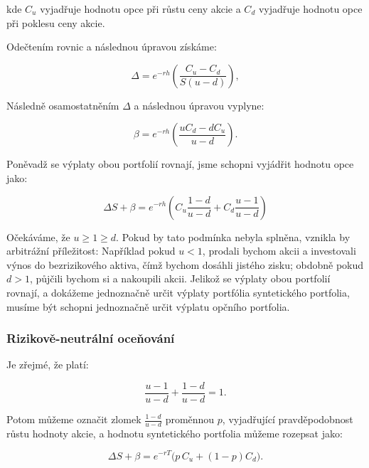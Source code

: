 \documentclass[male,czech,api_bc]{kitheses}
\begin{document}
  kde $C_u$ vyjadřuje hodnotu opce při růstu ceny akcie a $C_d$ vyjadřuje hodnotu opce při poklesu ceny akcie.

  Odečtením rovnic a následnou úpravou získáme: 

  \begin{equation}
    \Delta = e^{-rh} \left( \frac{C_u - C_d}{S (u - d)} \right),
  \end{equation}

  Následně osamostatněním $\Delta$ a následnou úpravou vyplyne:

  \begin{equation}
    \beta = e^{-rh} \left( \frac{u C_d - d C_u}{u - d} \right).
  \end{equation}

  Poněvadž se výplaty obou portfolií rovnají, jsme schopni vyjádřit hodnotu opce jako:

  \begin{equation}
    \label{eq_value}
    \Delta S + \beta = e^{-rh} \left( C_u \frac{1 - d}{u - d} + C_d \frac{u - 1}{u - d} \right)
  \end{equation}

  Očekáváme, že $u \ge 1 \ge d$. Pokud by tato podmínka nebyla splněna, vznikla by arbitrážní příležitost: Například pokud $u < 1$, prodali bychom akcii a investovali výnos do bezrizikového aktiva, čímž bychom dosáhli jistého zisku; obdobně pokud $d > 1$, půjčili bychom si a nakoupili akcii. \parencites[s.~311]{McDonald2013}
  Jelikož se výplaty obou portfolií rovnají, a dokážeme jednoznačně určit výplaty portfólia syntetického portfolia, musíme být schopni jednoznačně určit výplatu opčního portfolia.

 \subsubsection{Rizikově-neutrální oceňování}

 \label{sec:binom_rn}
 Je zřejmé, že platí:

 \begin{equation}
   \frac{u - 1}{u - d} + \frac{1 - d}{u - d} = 1.
 \end{equation}

 Potom můžeme označit zlomek $\frac{1 - d}{u - d}$ proměnnou $p$, vyjadřující pravděpodobnost růstu hodnoty akcie, a hodnotu syntetického portfolia můžeme rozepsat jako:

 \begin{equation}
    \Delta S + \beta = e^{-rT}\bigl(p \, C_u + (1-p) C_d\bigr). \label{eq_riskneutral}
 \end{equation}
\end{document}
